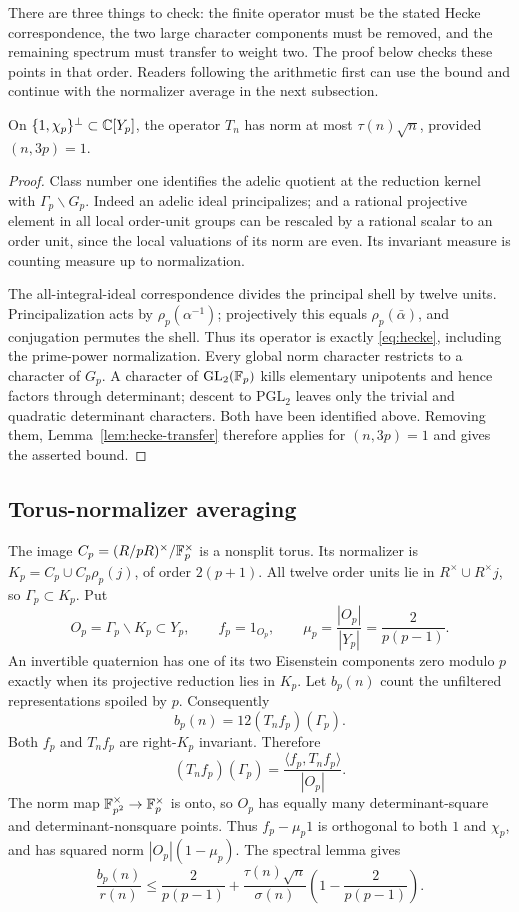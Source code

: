 There are three things to check: the finite operator must be the stated
Hecke correspondence, the two large character components must be removed,
and the remaining spectrum must transfer to weight two. The proof below
checks these points in that order. Readers following the arithmetic first
can use the bound and continue with the normalizer average in the next
subsection.

\begin{lemma}\label{lem:spectral}
On $\{1,\chi_p\}^\perp\subset\mathbb C[Y_p]$, the operator $T_n$ has norm at most
$\tau(n)\sqrt n$, provided $(n,3p)=1$.
\end{lemma}
\begin{proof}
Class number one identifies the adelic quotient at the reduction kernel
with $\Gamma_p\backslash G_p$.  Indeed an adelic ideal principalizes;
and a rational projective element in all local order-unit groups can
be rescaled by a rational scalar to an order unit, since the local
valuations of its norm are even.  Its invariant measure is counting
measure up to normalization.

The all-integral-ideal correspondence divides the principal shell by
twelve units.  Principalization acts by $\rho_p(\alpha^{-1})$;
projectively this equals $\rho_p(\bar\alpha)$, and conjugation
permutes the shell.  Thus its operator is exactly \eqref{eq:hecke},
including the prime-power normalization.  Every global norm character
restricts to a character of $G_p$.  A character of
$\mathrm{GL}_2(\mathbb F_p)$ kills elementary unipotents and hence factors
through determinant; descent to $\mathrm{PGL}_2$ leaves only the
trivial and quadratic determinant characters.  Both have been
identified above.  Removing them, Lemma~\ref{lem:hecke-transfer}
therefore applies for $(n,3p)=1$ and gives the asserted bound.
\end{proof}

\subsection{Torus-normalizer averaging}
The image $C_p=(R/pR)^\times/\mathbb F_p^\times$ is a nonsplit torus. Its
normalizer is $K_p=C_p\cup C_p\rho_p(j)$, of order $2(p+1)$.
All twelve order units lie in $R^\times\cup R^\times j$, so
$\Gamma_p\subset K_p$. Put
\[
O_p=\Gamma_p\backslash K_p\subset Y_p,\qquad f_p=1_{O_p},\qquad
\mu_p=\frac{|O_p|}{|Y_p|}=\frac2{p(p-1)}.
\]
An invertible quaternion has one of its two Eisenstein components zero
modulo $p$ exactly when its projective reduction lies in $K_p$.
Let $b_p(n)$ count the unfiltered representations spoiled by $p$. Consequently
\[
b_p(n)=12(T_nf_p)(\Gamma_p).
\]
Both $f_p$ and $T_nf_p$ are right-$K_p$ invariant. Therefore
\[
(T_nf_p)(\Gamma_p)=\frac{\langle f_p,T_nf_p\rangle}{|O_p|}.
\]
The norm map $\mathbb F_{p^2}^\times\to\mathbb F_p^\times$ is onto, so $O_p$ has
equally many determinant-square and determinant-nonsquare points.
Thus $f_p-\mu_p1$ is orthogonal to both $1$ and $\chi_p$, and has
squared norm $|O_p|(1-\mu_p)$. The spectral lemma gives
\begin{equation}\label{eq:local}
\frac{b_p(n)}{r(n)}
\le\frac2{p(p-1)}+
\frac{\tau(n)\sqrt n}{\sigma(n)}
\left(1-\frac2{p(p-1)}\right).
\end{equation}

